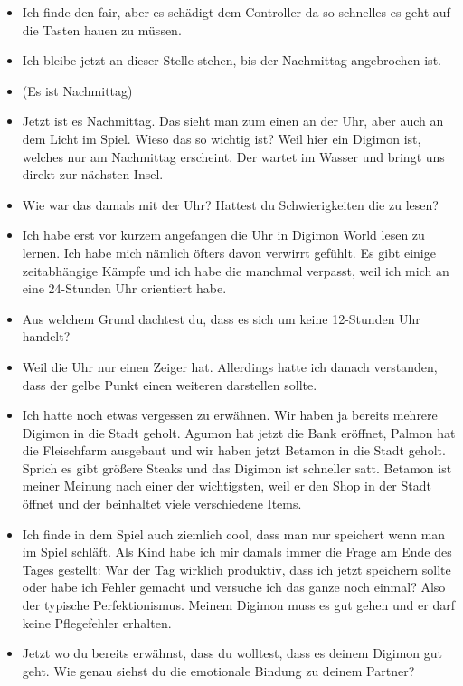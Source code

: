 {\begin{itemize}[]
    \item {} Ich finde den fair, aber es schädigt dem Controller da so schnelles es geht auf die Tasten hauen zu müssen. 
    \item {} Ich bleibe jetzt an dieser Stelle stehen, bis der Nachmittag angebrochen ist.
    \item {} (Es ist Nachmittag)
    \item {} Jetzt ist es Nachmittag. Das sieht man zum einen an der Uhr, aber auch an dem Licht im Spiel. Wieso das so wichtig ist? Weil hier ein Digimon ist, welches nur am Nachmittag erscheint. Der wartet im Wasser und bringt uns direkt zur nächsten Insel. 
    \item {} Wie war das damals mit der Uhr? Hattest du Schwierigkeiten die zu lesen?
    \item {} Ich habe erst vor kurzem angefangen die Uhr in Digimon World lesen zu lernen. Ich habe mich nämlich öfters davon verwirrt gefühlt. Es gibt einige zeitabhängige Kämpfe und ich habe die manchmal verpasst, weil ich mich an eine 24-Stunden Uhr orientiert habe. 
    \item {} Aus welchem Grund dachtest du, dass es sich um keine 12-Stunden Uhr handelt?
    \item {} Weil die Uhr nur einen Zeiger hat. Allerdings hatte ich danach verstanden, dass der gelbe Punkt einen weiteren darstellen sollte. 
    \item {} Ich hatte noch etwas vergessen zu erwähnen. Wir haben ja bereits mehrere Digimon in die Stadt geholt. Agumon hat jetzt die Bank eröffnet, Palmon hat die Fleischfarm ausgebaut und wir haben jetzt Betamon in die Stadt geholt. Sprich es gibt größere Steaks und das Digimon ist schneller satt.  Betamon ist meiner Meinung nach einer der wichtigsten, weil er den Shop in der Stadt öffnet und der beinhaltet viele verschiedene Items. 
    \item {} Ich finde in dem Spiel auch ziemlich cool, dass man nur speichert wenn man im Spiel schläft. Als Kind habe ich mir damals immer die Frage am Ende des Tages gestellt: War der Tag wirklich produktiv, dass ich jetzt speichern sollte oder habe ich Fehler gemacht und versuche ich das ganze noch einmal? Also der typische Perfektionismus. Meinem Digimon muss es gut gehen und er darf keine Pflegefehler erhalten. 
    \item {} Jetzt wo du bereits erwähnst, dass du wolltest, dass es deinem Digimon gut geht. Wie genau siehst du die emotionale Bindung zu deinem Partner?

\end{itemize}}
